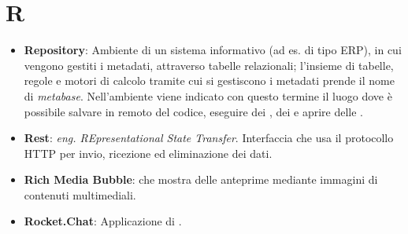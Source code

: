 \section{R}
\begin{itemize}
	\item
	\textbf{Repository}: Ambiente di un sistema informativo (ad es. di tipo ERP), in cui vengono gestiti i metadati, attraverso tabelle relazionali; l'insieme di tabelle, regole e motori di calcolo tramite cui si gestiscono i metadati prende il nome di \textit{metabase}. Nell'ambiente  viene indicato con questo termine il luogo dove è possibile salvare in remoto del codice, eseguire dei , dei  e aprire delle .
	\item
	\textbf{Rest}: \textit{eng. REpresentational State Transfer}. Interfaccia che usa il protocollo HTTP per invio, ricezione ed eliminazione dei dati.
	\item
	\textbf{Rich Media Bubble}:  che mostra delle anteprime mediante immagini di contenuti multimediali.
	\item
	\textbf{Rocket.Chat}: Applicazione di .
\end{itemize}
\newpage